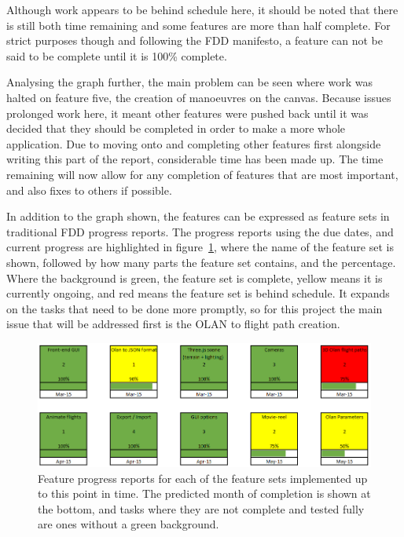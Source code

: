 Although work appears to be behind schedule here, it should be noted that there is still both time remaining and some features are more than half complete. For strict purposes though and following the FDD manifesto, a feature can not be said to be complete until it is 100\% complete. 

Analysing the graph further, the main problem can be seen where work was halted on feature five, the creation of manoeuvres on the canvas. Because issues prolonged work here, it meant other features were pushed back until it was decided that they should be completed in order to make a more whole application. Due to moving onto and completing other features first alongside writing this part of the report, considerable time has been made up. The time remaining will now allow for any completion of features that are most important, and also fixes to others if possible. 

In addition to the graph shown, the features can be expressed as feature sets in traditional FDD progress reports. The progress reports using the due dates, and current progress are highlighted in figure~\ref{fig:featureprogress}, where the name of the feature set is shown, followed by how many parts the feature set contains, and the percentage. Where the background is green, the feature set is complete, yellow means it is currently ongoing, and red means the feature set is behind schedule. It expands on the tasks that need to be done more promptly, so for this project the main issue that will be addressed first is the OLAN to flight path creation.

\begin{figure}[h!]
  \centering
      \includegraphics[width=1\textwidth]{images/featureProgress.png}
  \caption{Feature progress reports for each of the feature sets implemented up to this point in time. The predicted month of completion is shown at the bottom, and tasks where they are not complete and tested fully are ones without a green background.}
  \label{fig:featureprogress}
\end{figure}

